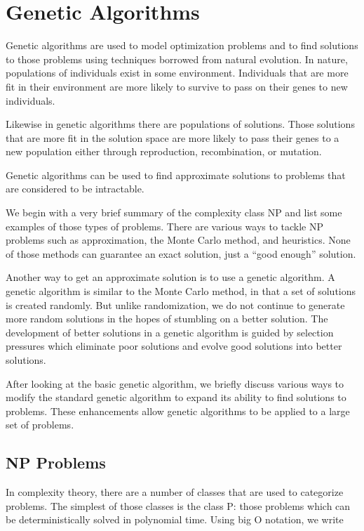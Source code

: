 \clearpage
\chapter{Genetic Algorithms}\label{chap:geneticAlgorithms}

Genetic algorithms are used to model optimization problems and to find solutions
to those problems using techniques borrowed from natural evolution. In nature,
populations of individuals exist in some environment. Individuals that are more
fit in their environment are more likely to survive to pass on their genes to
new individuals.

Likewise in genetic algorithms there are populations of solutions. Those
solutions that are more fit in the solution space are more likely to pass their
genes to a new population either through reproduction, recombination, or
mutation.

Genetic algorithms can be used to find approximate solutions to problems that
are considered to be intractable.

We begin with a very brief summary of the complexity class NP and list
some examples of those types of problems. There are various ways to tackle
NP problems such as approximation, the Monte Carlo method, and heuristics. None
of those methods can guarantee an exact solution, just a ``good enough''
solution.

Another way to get an approximate solution is to use a genetic algorithm. A
genetic algorithm is similar to the Monte Carlo method, in that a set of
solutions is created randomly. But unlike randomization, we do not continue to
generate more random solutions in the hopes of stumbling on a better solution.
The development of better solutions in a genetic algorithm is guided by
selection pressures which eliminate poor solutions and evolve good solutions
into better solutions.

After looking at the basic genetic algorithm, we briefly discuss various ways to
modify the standard genetic algorithm to expand its ability to find solutions to
problems. These enhancements allow genetic algorithms to be applied to a large
set of problems.

\section{NP Problems}

In complexity theory, there are a number of classes that are used to categorize
problems. The simplest of those classes is the class P: those problems which can
be deterministically solved in polynomial time. Using big O notation, we write


